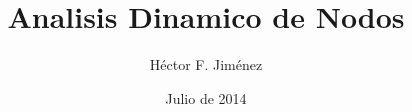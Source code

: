 \documentclass[11pt,a4paper]{article}
\begin{document}
\title{Analisis Dinamico de Nodos} 
\date{Julio de 2014}
\author{H\'ector F. Jim\'enez}
\maketitle

\thispagestyle{fancy}
\lipsum[1-9]
\end{document}
